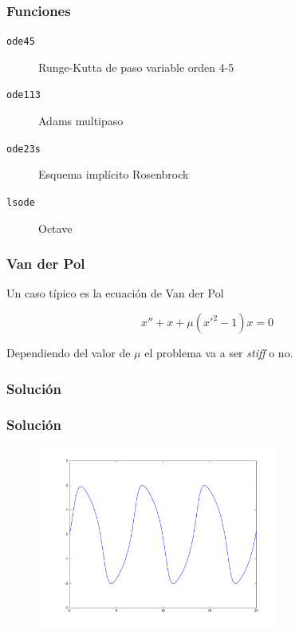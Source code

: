 \documentclass[12pt]{beamer}
\begin{document}
\begin{large}
\begin{frame}
  \frametitle{Funciones}
  \begin{description}
  \item[\texttt{ode45}] Runge-Kutta de paso variable orden 4-5
  \item[\texttt{ode113}] Adams multipaso
  \item[\texttt{ode23s}] Esquema implícito Rosenbrock
  \item[\texttt{lsode}] Octave
  \end{description}
\end{frame}

\begin{frame}
  \frametitle{Van der Pol}
Un caso típico es la ecuación de Van der Pol

\[ x'' + x +\mu(x'^2-1)x = 0 \]

Dependiendo del valor de $\mu$ el problema va a ser \emph{stiff} o no.
\end{frame}


\begin{frame}\frametitle{Solución}
\testcode
\end{frame}


\begin{frame}
  \frametitle{Solución}
  \begin{figure}[h]
    \centering{}
    \includegraphics[width=8cm, keepaspectratio]{fig/vdp1.pdf}
  \end{figure}
\end{frame}



\end{large}
\end{document}
